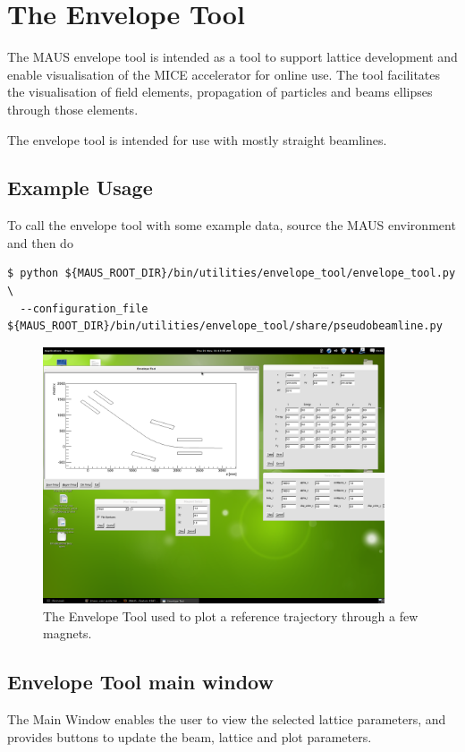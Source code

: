 \chapter{The Envelope Tool}

The MAUS envelope tool is intended as a tool to support lattice development and
enable visualisation of the MICE accelerator for online use. The tool 
facilitates the visualisation of field elements, propagation of particles and
beams ellipses through those elements.

The envelope tool is intended for use with mostly straight beamlines.

\section{Example Usage}
To call the envelope tool with some example data, source the MAUS environment 
and then do

\begin{verbatim}
$ python ${MAUS_ROOT_DIR}/bin/utilities/envelope_tool/envelope_tool.py \
  --configuration_file ${MAUS_ROOT_DIR}/bin/utilities/envelope_tool/share/pseudobeamline.py
\end{verbatim}

\begin{figure}[!htb]
\centering
\includegraphics[width=0.9\textwidth]{envelope_tool.png}
\caption{The Envelope Tool used to plot a reference trajectory through a few magnets.}
\end{figure}

\section{Envelope Tool main window}
The Main Window enables the user to view the selected lattice parameters, and
provides buttons to update the beam, lattice and plot parameters.

